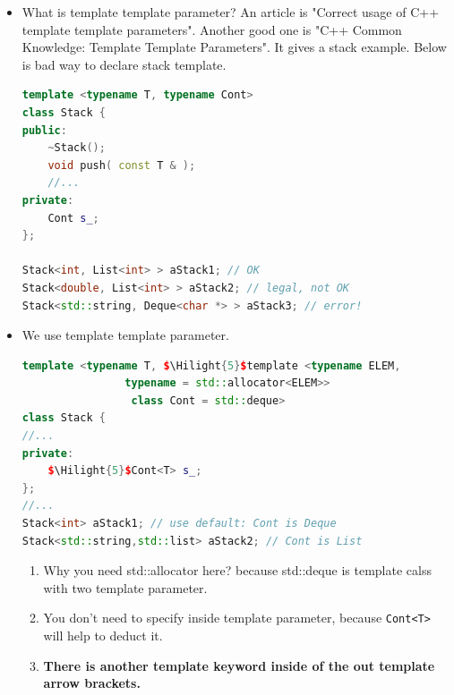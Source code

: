 \documentclass[a4paper,11pt,twoside]{book}
\newcommand{\Hilight}[1]{\makebox[0pt][l]{\color{yellow}\rule[-3pt]{#1em}{11pt}}}
\newcommand{\Hilight}[1]{}
\begin{document}
\begin{itemize}
\item What is template template parameter? An article is "Correct usage of C++ template template parameters". Another good one is "C++ Common Knowledge: Template Template Parameters". It gives a stack example. Below is bad way to declare stack template.
\begin{lstlisting}[frame=single, language=c++]
template <typename T, typename Cont>
class Stack {
public:
	~Stack();
	void push( const T & );
	//...
private:
	Cont s_;
};

Stack<int, List<int> > aStack1; // OK
Stack<double, List<int> > aStack2; // legal, not OK           
Stack<std::string, Deque<char *> > aStack3; // error!   
\end{lstlisting}
\item We use template template parameter. 

\begin{lstlisting}[frame=single, language=c++]
template <typename T, $\Hilight{5}$template <typename ELEM,
				typename = std::allocator<ELEM>>
				 class Cont = std::deque>
class Stack {
//...
private:
	$\Hilight{5}$Cont<T> s_;
};
//...
Stack<int> aStack1; // use default: Cont is Deque
Stack<std::string,std::list> aStack2; // Cont is List
\end{lstlisting}
\begin{enumerate}
	\item Why you need std::allocator here? because std::deque is template calss with two template parameter.
	
	\item You don't need to specify inside template parameter, because \texttt{Cont<T>} will help to deduct it.
	
	\item \textbf{There is another template keyword inside of the out template arrow brackets.}
	
\end{enumerate}

\end{itemize}
\end{document}
